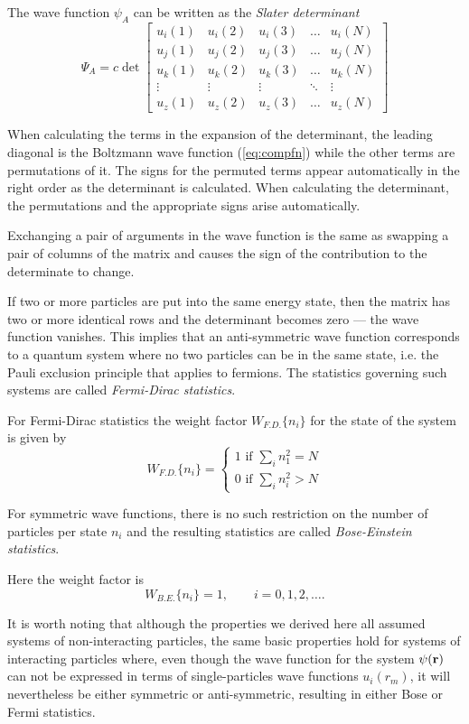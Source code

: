 \documentclass{article}
\begin{document}
The wave function $\psi_A$ can be written as the \emph{Slater determinant} 
$$
	\Psi_A = c\det\begin{bmatrix}
		u_i(1) & u_i(2) & u_i(3) & \dots & u_i(N)\\
		u_j(1) & u_j(2) & u_j(3) & \dots & u_j(N)\\
		u_k(1) & u_k(2) & u_k(3) & \dots & u_k(N)\\
		\vdots & \vdots & \vdots & \ddots & \vdots \\
		u_z(1) & u_z(2) & u_z(3) & \dots & u_z(N)
	\end{bmatrix}
$$

When calculating the terms in the expansion of the determinant, the leading diagonal is the Boltzmann wave function (\ref{eq:compfn}) while the other terms are permutations of it. The signs for the permuted terms appear automatically in the right order as the determinant is calculated. When calculating the determinant, the permutations and the appropriate signs arise automatically.

Exchanging a pair of arguments in the wave function is the same as swapping a pair of columns of the matrix and causes the sign of the contribution to the determinate to change.

If two or more particles are put into the same energy state, then the matrix has two or more identical rows and the determinant becomes zero --- the wave function vanishes. This implies that an anti-symmetric wave function corresponds to a quantum system where no two particles can be in the same state, i.e. the Pauli exclusion principle that applies to fermions. The statistics governing such systems are called \emph{Fermi-Dirac statistics}.

For Fermi-Dirac statistics the weight factor $W_{F.D.}\{n_i\}$ for the state of the system is given by
$$
	W_{F.D.}\{n_i\} = 
	\begin{cases}
		1 \text{ if } \sum_i n_1^2 = N\\
		0 \text{ if } \sum_i n_i^2 > N
	\end{cases}
$$


For symmetric wave functions, there is no such restriction on the number of particles per state $n_i$ and the resulting statistics are called \emph{Bose-Einstein statistics}.

Here the weight factor is
$$
	W_{B.E.}\{n_i\} = 1,\qquad i=0,1,2,\ldots.
$$

It is worth noting that although the properties we derived here all assumed systems of non-interacting particles, the same basic properties hold for systems of interacting particles where, even though the wave function for the system $\psi({\bf r})$ can not be expressed in terms of single-particles wave functions $u_i(r_m)$, it will nevertheless be either symmetric or anti-symmetric, resulting in either Bose or Fermi statistics.
\end{document}
